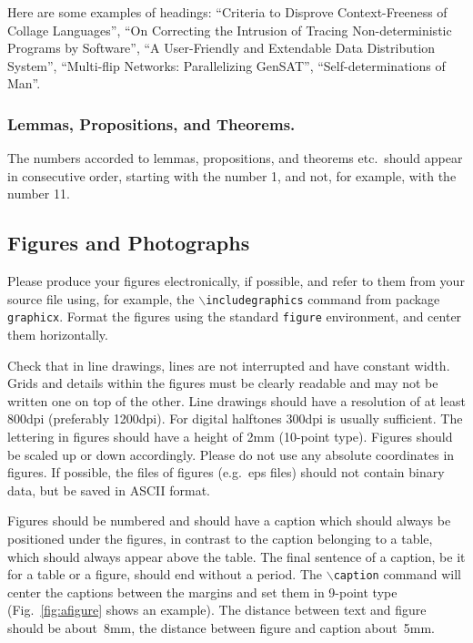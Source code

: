 \documentclass[runningheads]{AIIT}
\begin{document}
Here are some examples of headings: ``Criteria to Disprove Context-Freeness of
Collage Languages'', ``On Correcting the Intrusion of Tracing
Non-deterministic Programs by Software'', ``A User-Friendly and Extendable
Data Distribution System'', ``Multi-flip Networks: Parallelizing GenSAT'',
``Self-determinations of Man''.

\subsubsection{Lemmas, Propositions, and Theorems.} The numbers accorded to lemmas,
propositions, and theorems etc.\ should appear in consecutive order, starting
with the number 1, and not, for example, with the number 11.

\subsection{Figures and Photographs}

Please produce your figures electronically, if possible, and refer to them
from your source file using, for example, the
\texttt{$\backslash$includegraphics} command from package \texttt{graphicx}.
Format the figures using the standard \texttt{figure} environment, and center
them horizontally.

Check that in line drawings, lines are not interrupted and have constant
width. Grids and details within the figures must be clearly readable and may
not be written one on top of the other. Line drawings should have a resolution
of at least 800dpi (preferably 1200dpi). For digital halftones 300dpi is
usually sufficient. The lettering in figures should have a height of 2mm
(10-point type). Figures should be scaled up or down accordingly. Please do
not use any absolute coordinates in figures. If possible, the files of figures
(e.g.\ eps files) should not contain binary data, but be saved in ASCII
format.

Figures should be numbered and should have a caption which should always be
positioned under the figures, in contrast to the caption belonging to a table,
which should always appear above the table. The final sentence of a caption,
be it for a table or a figure, should end without a period. The
\texttt{$\backslash$caption} command will center the captions between the
margins and set them in 9-point type (Fig.~\ref{fig:afigure} shows an
example). The distance between text and figure should be about~8mm, the
distance between figure and caption about~5mm.
\end{document}
